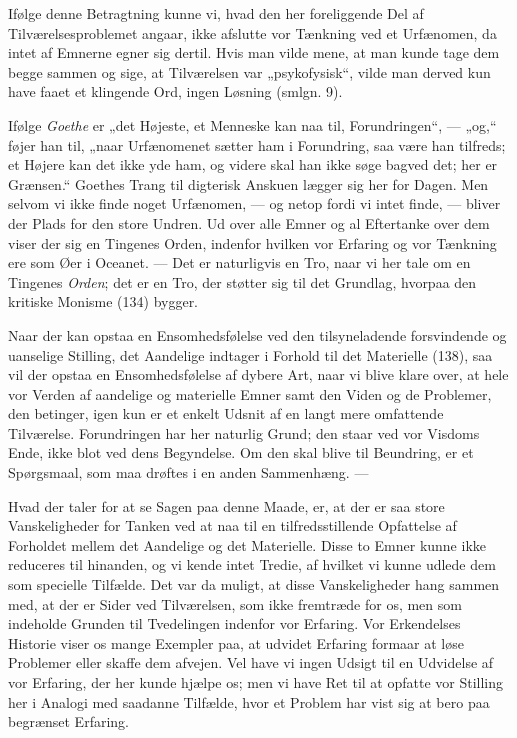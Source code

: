 \documentclass[12pt,a4paper]{book}
\newcommand{\opage}[1]{\marginnote{\footnotesize\textit{[#1]}}}
\begin{document}
Ifølge denne Betragtning kunne vi, hvad den her foreliggende Del af Tilværelsesproblemet
angaar, ikke afslutte vor Tænkning ved et Urfænomen, da intet af Emnerne egner sig dertil.
Hvis man vilde mene, at man kunde tage dem begge sammen og sige, at Tilværelsen var
„psykofysisk“, vilde man derved kun have faaet et klingende Ord, ingen Løsning (smlgn. 9).

Ifølge \emph{Goethe} er „det Højeste, et Menneske kan naa til, Forundringen“, --- „og,“
føjer han til, „naar Urfænomenet sætter ham i Forundring, saa være han tilfreds; et Højere
\opage{336} kan det ikke yde ham, og videre skal han ikke søge bagved det; her er Grænsen.“ Goethes
Trang til digterisk Anskuen lægger sig her for Dagen. Men selvom vi ikke finde noget
Urfænomen, --- og netop fordi vi intet finde, --- bliver der Plads for den store Undren. Ud
over alle Emner og al Eftertanke over dem viser der sig en Tingenes Orden, indenfor hvilken
vor Erfaring og vor Tænkning ere som Øer i Oceanet. --- Det er naturligvis en Tro, naar vi
her tale om en Tingenes \emph{Orden}; det er en Tro, der støtter sig til det Grundlag,
hvorpaa den kritiske Monisme (134) bygger.

Naar der kan opstaa en Ensomhedsfølelse ved den tilsyneladende forsvindende og uanselige
Stilling, det Aandelige indtager i Forhold til det Materielle (138), saa vil der opstaa en
Ensomhedsfølelse af dybere Art, naar vi blive klare over, at hele vor Verden af aandelige
og materielle Emner samt den Viden og de Problemer, den betinger, igen kun er et enkelt
Udsnit af en langt mere omfattende Tilværelse. Forundringen har her naturlig Grund; den staar ved vor Visdoms Ende, ikke blot ved dens Begyndelse. Om den skal blive til Beundring, er
et Spørgsmaal, som maa drøftes i en anden Sammenhæng. ---

Hvad der taler for at se Sagen paa denne Maade, er, at der er saa store Vanskeligheder for
Tanken ved at naa til en tilfredsstillende Opfattelse af Forholdet mellem det Aandelige og
det Materielle. Disse to Emner kunne ikke reduceres til hinanden, og vi kende intet Tredie, af
hvilket vi kunne udlede dem som specielle Tilfælde. Det var da muligt, at disse
Vanskeligheder hang sammen med, at der er Sider ved Tilværelsen, som ikke fremtræde for os,
men som indeholde Grunden til Tvedelingen indenfor vor Erfaring. Vor Erkendelses Historie
viser os mange Exempler paa, at udvidet Erfaring formaar at løse Problemer eller skaffe dem
afvejen. Vel have vi ingen Udsigt til en Udvidelse af vor Erfaring, der her kunde hjælpe
os; men vi have Ret til at opfatte vor Stilling her i Analogi med saadanne Tilfælde, hvor
et Problem har vist sig at bero paa begrænset Erfaring.
\end{document}
